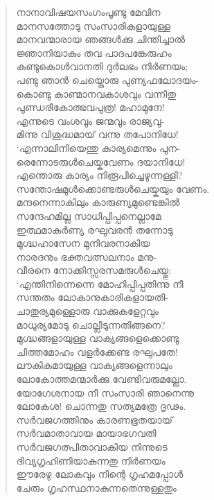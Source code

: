 \begin{verse}
നാനാവിഷയസംഗംപൂണ്ടു മേവിന\\
മാനസത്തോടു സംസാരികളായുള്ള\\
മാനവന്മാരായ ഞങ്ങള്‍ക്കു ചിന്തിച്ചാല്‍\\
ജ്ഞാനിയാകും തവ പാദപങ്കേരുഹം\\
കണ്ടുകൊള്‍വാനതി ദുര്‍ലഭം നിര്‍ണയം;\\
പണ്ടു ഞാന്‍ ചെയ്തൊരു പുണ്യഫലോദയം-\\
കൊണ്ടു കാണ്മാനവകാശവും വന്നിതു\\
പുണ്ഡരീകോത്ഭവപുത്ര! മഹാമുനേ!\\
എന്നുടെ വംശവും ജന്മവും രാജ്യവു-\\
മിന്നു വിശുദ്ധമായ് വന്നു തപോനിധേ!\\
‘എന്നാലിനിയെന്തു കാര്യമെന്നും പുന-\\
രെന്നോടരുള്‍ചെയ്കവേണം ദയാനിധേ!\\
എന്തൊരു കാര്യം നിരൂപിച്ചെഴുന്നള്ളി?\\
സന്തോഷമുള്‍ക്കൊണ്ടരുള്‍ചെയ്കയും വേണം.\\
മന്ദനെന്നാകിലും കാരുണ്യമുണ്ടെങ്കില്‍\\
സന്ദേഹമില്ല സാധിപ്പിപ്പനെല്ലാമേ\\
ഇത്ഥമാകര്‍ണ്യ രഘുവരന്‍ തന്നോടു\\
മുഗ്ദ്ധഹാസേന മുനിവരനാകിയ\\
നാരദനും ഭക്തവത്സലനാം മനു-\\
വീരനെ നോക്കിസ്സരസമരുള്‍ചെയ്തു:\\
‘എന്തിനിന്നെന്നെ മോഹിപ്പിപ്പതിന്നു നീ\\
സന്തതം ലോകാനുകാരികളായതി-\\
ചാതുര്യമുള്ളൊരു വാക്കുകളേറ്റവും\\
മാധുര്യമോടു ചൊല്ലീടുന്നതിങ്ങനെ?\\
മുഗ്ദ്ധങ്ങളായുള്ള വാക്യങ്ങളെക്കൊണ്ടു\\
ചിത്തമോഹം വളര്‍ക്കേണ്ട രഘുപതേ!\\
ലൗകികമായുള്ള വാക്യങ്ങളെന്നാലും\\
ലോകോത്തമന്മാര്‍ക്കു വേണ്ടിവരുമല്ലോ.\\
യോഗേശനായ നീ സംസാരി ഞാനെന്നു\\
ലോകേശ! ചൊന്നതു സത്യമത്രേ ദൃഢം.\\
സര്‍വജഗത്തിനും കാരണഭൂതയായ്\\
സര്‍വമാതാവായ മായാഭഗവതി\\
സര്‍വജഗത്പിതാവാകിയ നിന്നുടെ\\
ദിവ്യഗൃഹിണിയാകുന്നതു നിര്‍ണയം\\
ഈരേഴു ലോകവും നിന്റെ ഗൃഹമപ്പോള്‍\\
ചേരും ഗൃഹസ്ഥനാകുന്നതെന്നുള്ളതും\\

\end{verse}
